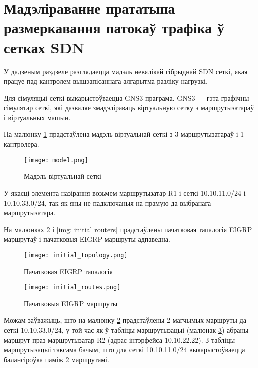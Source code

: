 \section{Мадэліраванне прататыпа размеркавання патокаў трафіка ў сетках SDN}

У дадзеным раздзеле разглядаецца мадэль невялікай гібрыднай SDN сеткі, якая працуе
пад кантролем вышэапісаннага алгарытма разліку нагрузкі.

Для сімуляцыі сеткі выкарыстоўваецца GNS3 праграма.
GNS3 --- гэта графічны сімулятар сеткі, які дазваляе змадэліраваць віртуальную
сетку з маршрутызатараў і віртуальных машын.

На малюнку \ref{img: model} прадстаўлена мадэль віртуальнай сеткі з 3 маршрутызатараў і 1 кантролера.

\begin{figure}[h!]
    \centering
    \texttt{[image: model.png]}
    \caption{Мадэль віртуальнай сеткі}
    \label{img: model} 
\end{figure}

У якасці элемента назірання возьмем маршрутызатар R1 і сеткі 10.10.11.0/24 і 10.10.33.0/24,
так як яны не падключаныя на прамую да выбранага маршрутызатара.

На малюнках \ref{img: initial topology} і \ref{img: initial routers} прадстаўлены
пачатковая тапалогія EIGRP маршрутаў і пачатковыя EIGRP маршруты адпаведна.

\clearpage

\begin{figure}[h!]
    \centering
    \texttt{[image: initial\_topology.png]}
    \caption{Пачатковая EIGRP тапалогія}
    \label{img: initial topology} 
\end{figure}

\vspace{-\baselineskip}

\begin{figure}[h!]
    \centering
    \texttt{[image: initial\_routes.png]}
    \caption{Пачатковыя EIGRP маршруты}
    \label{img: initial routes} 
\end{figure}

Можам заўважыць, што на малюнку \ref{img: initial topology} прадстаўлены 2 магчымых
маршруты да сеткі 10.10.33.0/24, у той час як ў табліцы маршрутызацыі (малюнак
\ref{img: initial routes}) абраны маршрут праз маршрутызатар R2 (адрас інтэрфейса 10.10.22.22). З табліцы маршрутызацыі таксама бачым, што для сеткі 10.10.11.0/24 выкарыстоўваецца балансіроўка паміж 2 маршрутамі.

